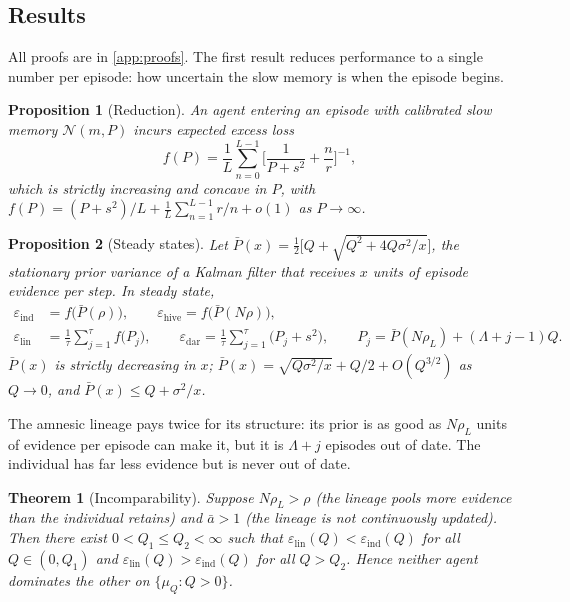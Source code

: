 \documentclass[11pt]{article}
\theoremstyle{plain}
\newtheorem{theorem}{Theorem}
\newtheorem{proposition}{Proposition}
\theoremstyle{definition}
\theoremstyle{remark}
\newcommand{\abar}{\bar a}
\newcommand{\Pbar}{\bar P}
\newcommand{\eps}{\varepsilon}
\begin{document}
\subsection{Results}
All proofs are in \cref{app:proofs}. The first result reduces performance to a single number per episode: how uncertain the slow memory is when the episode begins.

\begin{proposition}[Reduction]
\label{prop:reduction}
An agent entering an episode with calibrated slow memory $\mathcal{N}(m,P)$ incurs expected excess loss
\begin{equation}
f(P)=\frac1L\sum_{n=0}^{L-1}\Big[\frac{1}{P+s^2}+\frac{n}{r}\Big]^{-1},
\label{eq:f}
\end{equation}
which is strictly increasing and concave in $P$, with $f(P)=(P+s^2)/L+\frac1L\sum_{n=1}^{L-1}r/n+o(1)$ as $P\to\infty$.
\end{proposition}

\begin{proposition}[Steady states]
\label{prop:steady}
Let $\Pbar(x)=\tfrac12\big[Q+\sqrt{Q^2+4Q\sigma^2/x}\big]$, the stationary prior variance of a Kalman filter that receives $x$ units of episode evidence per step. In steady state,
\begin{align}
\eps_{\mathrm{ind}}&=f\big(\Pbar(\rho)\big), \qquad \eps_{\mathrm{hive}}=f\big(\Pbar(N\rho)\big),\\
\eps_{\mathrm{lin}}&=\frac1\tau\sum_{j=1}^{\tau}f\big(P_j\big),\qquad \eps_{\mathrm{dar}}=\frac1\tau\sum_{j=1}^{\tau}\big(P_j+s^2\big),\qquad P_j=\Pbar(N\rho_L)+(\Lambda+j-1)Q.
\end{align}
$\Pbar(x)$ is strictly decreasing in $x$; $\Pbar(x)=\sqrt{Q\sigma^2/x}+Q/2+O(Q^{3/2})$ as $Q\to0$, and $\Pbar(x)\le Q+\sigma^2/x$.
\end{proposition}

The amnesic lineage pays twice for its structure: its prior is as good as $N\rho_L$ units of evidence per episode can make it, but it is $\Lambda+j$ episodes out of date. The individual has far less evidence but is never out of date.

\begin{theorem}[Incomparability]
\label{thm:incomparable}
Suppose $N\rho_L>\rho$ (the lineage pools more evidence than the individual retains) and $\abar>1$ (the lineage is not continuously updated). Then there exist $0<Q_1\le Q_2<\infty$ such that $\eps_{\mathrm{lin}}(Q)<\eps_{\mathrm{ind}}(Q)$ for all $Q\in(0,Q_1)$ and $\eps_{\mathrm{lin}}(Q)>\eps_{\mathrm{ind}}(Q)$ for all $Q>Q_2$. Hence neither agent dominates the other on $\{\mu_Q:Q>0\}$.
\end{theorem}
\end{document}
